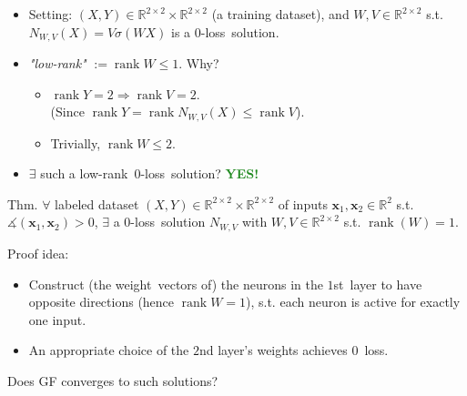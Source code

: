 \documentclass[handout,usenames,dvipsnames]{beamer} %
\DeclareMathOperator{\rank}{rank}
\newcommand{\bx}{\mathbf{x}}
\newcommand{\reals}{{\mathbb R}}
\newcommand{\true}[1]{{\textcolor{ForestGreen}{\textbf{#1}}}}
\begin{document}
\begin{frame}
    \pause
    \begin{itemize}
        \item Setting: $(X, Y) \in \mathbb{R}^{2 \times 2} \times \mathbb{R}^{2 \times 2}$ (a training dataset), and $W,V\in \reals^{2 \times 2}$ s.t. $N_{W,V}(X)=V\sigma(WX)$ is a 0-loss~solution.
        \pause
        \item \emph{"low-rank"} $:= \rank W \leq 1$. Why?
        \pause
        \begin{itemize}
            \item $\rank Y = 2 \Rightarrow \rank V = 2$.\\(Since $\rank Y =\rank N_{W,V}(X)  \leq \rank V$).
            \pause
            \item Trivially, $\rank W \leq 2$.
        \end{itemize}
        \pause
        \item $\exists$ such a low-rank~0-loss~solution?
        \pause 
        \true{YES!}
    \end{itemize}
        \begin{exampleblock}{Thm.}
          $\forall$ labeled dataset $(X, Y) \in \mathbb{R}^{2 \times 2} \times \mathbb{R}^{2 \times 2}$ of inputs $\bx_1, \bx_2 \in \mathbb{R}^2$ s.t. $\measuredangle(\bx_1, \bx_2) > 0$, $\exists$ a 0-loss~solution $N_{W,V}$ with $W,V \in \reals^{2 \times 2}$ s.t. $\rank(W)=1$.
    \end{exampleblock}
    \pause
    Proof idea:
    \pause
    \begin{itemize}
        \item Construct (the weight~vectors of) the neurons in the $1$st~layer to have opposite directions (hence $\rank W = 1$), s.t. each neuron is active for exactly one input.
        \pause
        \item An appropriate choice of the $2$nd layer’s weights achieves 0~loss.
    \end{itemize}
    \pause
    Does GF converges to such solutions?
\end{frame}
\end{document}

